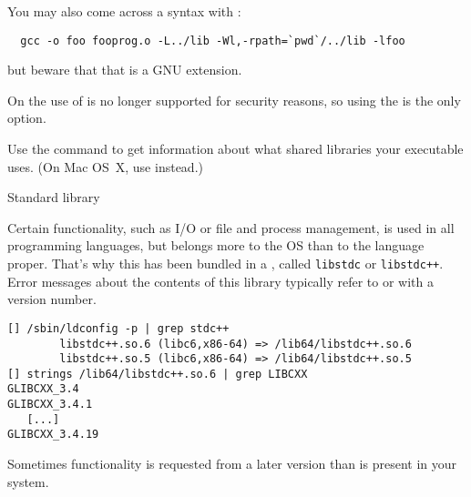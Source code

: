 \begin{remark}
  You may also come across a syntax with :
\begin{verbatim}
  gcc -o foo fooprog.o -L../lib -Wl,-rpath=`pwd`/../lib -lfoo
\end{verbatim}
but beware that that is a GNU extension.
\end{remark}

\begin{remark}
  On  the use of 
  is no longer supported for security reasons, so using the  is the only option.
\end{remark}
Use the command  to get information about what shared libraries
your executable uses. (On Mac OS~X, use  instead.)

 {Standard library}

Certain functionality, such as I/O or file and process management,
is used in all programming languages, but belongs more
to the \ac{OS} than to the language proper.
That's why this has been bundled in a ,
called \lstinline{libstdc} or \lstinline{libstdc++}.
Error messages about the contents of this library typically
refer to  or 
with a version number.
\begin{lstlisting}
[] /sbin/ldconfig -p | grep stdc++
        libstdc++.so.6 (libc6,x86-64) => /lib64/libstdc++.so.6
        libstdc++.so.5 (libc6,x86-64) => /lib64/libstdc++.so.5
[] strings /lib64/libstdc++.so.6 | grep LIBCXX
GLIBCXX_3.4
GLIBCXX_3.4.1
   [...]
GLIBCXX_3.4.19
\end{lstlisting}
Sometimes functionality is requested
from a later version than is present in your system.




